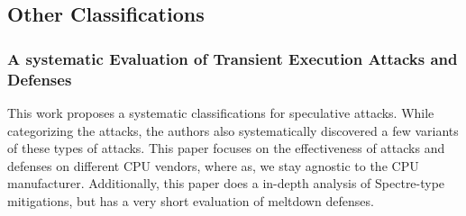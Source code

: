 \subsection{Other Classifications}
\subsubsection{A systematic Evaluation of Transient Execution Attacks and Defenses \cite{b48}}

This work proposes a systematic classifications for speculative attacks. While categorizing
the attacks, the authors also systematically discovered a few variants of these types of attacks.
This paper focuses on the effectiveness of attacks and defenses on different CPU vendors, where as,
we stay agnostic to the CPU manufacturer. Additionally, this paper does a in-depth analysis of Spectre-type
mitigations, but has a very short evaluation of meltdown defenses.
